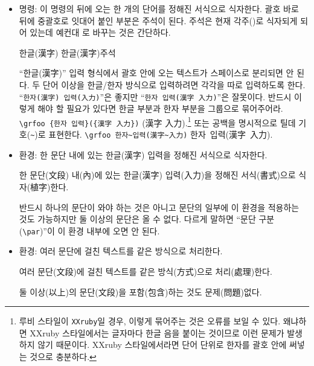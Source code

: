 \documentclass[a4paper,12pt,itemph,footnote]{oblivoir}
\begin{document}
\begin{itemize}
\item \mycmd{\grfoo} 명령: 이 명령의 뒤에 오는 한 개의 단어를 정해진 서식으로 식자한다. 괄호 바로 뒤에 중괄호로 잇대어 붙인 부분은 주석이 된다. 주석은 현재 각주(\cmd{\footnote})로 식자되게 되어 있는데 예컨대 \cmd{\sidefootnote}로 바꾸는 것은 간단하다.
\begin{myexam}[]
\grfoo 한글(漢字) \grfoo 한글(漢字){주석}
\end{myexam}
``한글(漢字)'' 입력 형식에서 괄호 안에 오는 텍스트가 스페이스로 분리되면 안 된다. 두 단어 이상을 한글/한자 방식으로 입력하려면 각각을 따로 입력하도록 한다. ``\verb*|한자(漢字) 입력(入力)|''은 좋지만 ``\verb*|한자 입력(漢字 入力)|''은 잘못이다. 반드시 이렇게 해야 할 필요가 있다면 한글 부분과 한자 부분을 그룹으로 묶어주어라. \verb*|\grfoo {한자 입력}({漢字 入力})| ({漢字 入力}).\footnote{루비 스타일이 \texttt{XXruby}일 경우, 이렇게 묶어주는 것은 오류를 보일 수 있다. 왜냐하면 XXruby 스타일에서는 글자마다 한글 음을 붙이는 것이므로 이런 문제가 발생하지 않기 때문이다. XXruby 스타일에서라면 단어 단위로 한자를 괄호 안에 써넣는 것으로 충분하다.} 또는 공백을 명시적으로 틸데 기호(\verb|~|)로 표현한다. \verb*|\grfoo 한자~입력(漢字~入力)| \grfoo 한자~입력(漢字~入力).

\item{} 환경: 한 문단 내에 있는 한글(漢字) 
입력을 정해진 서식으로 식자한다.
\begin{myexam}[]
\begin{grruby}
한 문단(文段) 내(內)에 있는 한글(漢字) 입력(入力)을
정해진 서식(書式)으로 식자(植字)한다.
\end{grruby}
\end{myexam}

반드시 하나의 문단이 와야 하는 것은 아니고 문단의 일부에 이 환경을 적용하는 것도 가능하지만 둘 이상의 문단은 올 수 없다. 다르게 말하면 ``문단 구분(\verb|\par|)''이 이 환경 내부에 오면 안 된다.

\item {} 환경: 여러 문단에 걸친 텍스트를 같은 방식으로 처리한다.
\begin{tcboutputlisting}
\begin{grrubypars}
여러 문단(文段)에 걸친 텍스트를 같은 방식(方式)으로 처리(處理)한다.

둘 이상(以上)의 문단(文段)을 포함(包含)하는 것도 문제(問題)없다.
\end{grrubypars}
\end{tcboutputlisting}


\end{itemize}
\end{document}
